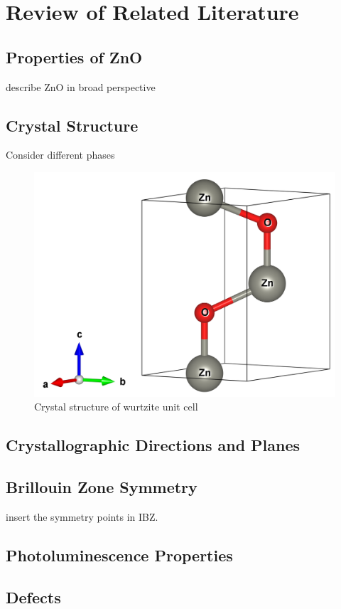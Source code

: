 \chapter{Review of Related Literature}
\section{Properties of ZnO}
    describe ZnO in broad perspective
\section{Crystal Structure}
Consider different phases

\begin{figure}[tbh!] 
	\centering
	\includegraphics[width=0.5\linewidth]{"images/rrl/ZnO_unit"}
	\caption[Crystal structure of wurtzite  unit cell]{Crystal structure of wurtzite  unit cell}
	\label{fig:ZnO_unit}
\end{figure}

\section{Crystallographic Directions and Planes}
\section{Brillouin Zone Symmetry}
    {\color{red} insert the symmetry points in IBZ.}
\section{Photoluminescence Properties}
\section{Defects}

